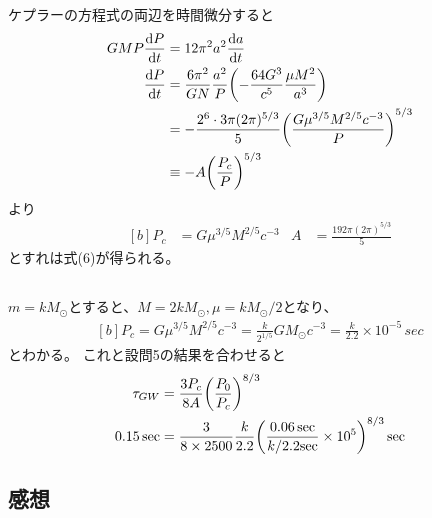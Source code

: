 \documentclass[../../sp_2018.tex]{subfiles}
\begin{document}
\subsection{}
ケプラーの方程式の両辺を時間微分すると
\begin{equation}\begin{aligned}[b]
    GMP\dv{P}{t} &= 12\pi^2 a^2\dv{a}{t}\\
    \dv{P}{t} &= \frac{6\pi^2}{GN}\frac{a^2}{P}\qty(-\frac{64G^3}{c^5}\frac{\mu M^2}{a^3})\\
    &= -\frac{2^6\cdot 3\pi (2\pi)^{5/3}}{5}\qty(\frac{G\mu^{3/5}M^{2/5}c^{-3}}{P})^{5/3}\\
    &\equiv -A \qty(\frac{P_c}{P})^{5/3}
\end{aligned}\end{equation}
より
\begin{equation}\begin{aligned}[b]
    P_c &=G\mu^{3/5}M^{2/5}c^{-3} & A &= \frac{192\pi (2\pi)^{5/3}}{5}
\end{aligned}\end{equation}
とすれは式(6)が得られる。

\subsection{}
\(m=kM_{\odot}\)とすると、\(M=2kM_{\odot},\mu=kM_{\odot}/2\)となり、
\begin{equation}\begin{aligned}[b]
    P_c =G\mu^{3/5}M^{2/5}c^{-3}=\frac{k}{2^{1/5}}GM_\odot c^{-3}=\frac{k}{2.2}\times10^{-5}\,\si{sec}
\end{aligned}\end{equation}
とわかる。
これと設問5の結果を合わせると
\begin{equation}\begin{aligned}[b]
    \tau_{GW} &=\frac{3P_c}{8A}\qty(\frac{P_0}{P_c})^{8/3}\\
    0.15 \,\si{sec} &= \frac{3}{8\times2500}\frac{k}{2.2}\qty(\frac{0.06\,\si{sec}}{k/2.2\si{sec}}\times 10^5)^{8/3}\,\si{sec}
\end{aligned}\end{equation}

\subsection*{感想}
\end{document}
